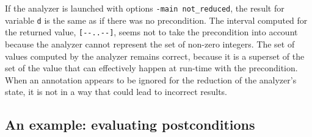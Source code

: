 \documentclass[web]{frama-c-book}
\begin{document}
If the analyzer is launched with 
options \lstinline|-main not_reduced|,
the result for variable \lstinline|d| is the same as if there was no
precondition. The interval computed for the returned 
value, \lstinline|[--..--]|,
seems not to take the precondition into account because the analyzer
cannot represent the set of non-zero integers.
The set of values computed by the analyzer remains correct, because
it is a superset of the set of the value that can effectively
happen at run-time with the precondition. When an annotation appears to
be ignored for the reduction of the analyzer's state, it is not in
a way that could lead to incorrect results.


\subsection{An example: evaluating postconditions}
\label{sec:evaluating-postconditions}
\end{document}
